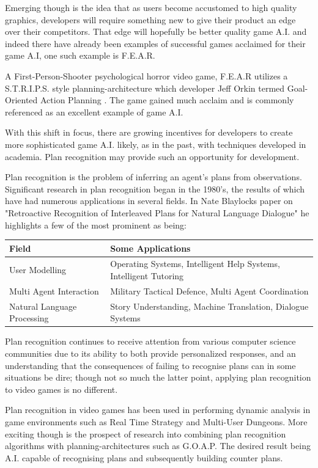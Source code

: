 \documentclass[parskip]{cs4rep}
\begin{document}
Emerging though is the idea that as users become accustomed to high quality graphics, developers will require something new to give their product an edge over their competitors. That edge will hopefully be better quality game A.I. and indeed there have already been examples of successful games acclaimed for their game A.I, one such example is F.E.A.R. 

A First-Person-Shooter psychological horror video game, F.E.A.R utilizes a S.T.R.I.P.S. style planning-architecture which developer Jeff Orkin termed Goal-Oriented Action Planning \cite{citeulike:5386647}. The game gained much acclaim and is commonly referenced as an excellent example of game A.I.

With this shift in focus, there are growing incentives for developers to create more sophisticated game A.I. likely, as in the past, with techniques developed in academia. Plan recognition may provide such an opportunity for development. 

Plan recognition is the problem of inferring an agent's plans from observations. Significant research in plan recognition began in the 1980's, the results of which have had numerous applications in several fields. In Nate Blaylocks paper on "Retroactive Recognition of Interleaved Plans for Natural Language Dialogue" \cite{oai:CiteSeerPSU:538953} he highlights a few of the most prominent as being:

\begin{tabular}{|l|p{8cm}|}
\hline 
\textbf{Field} & \textbf{Some Applications} \\ 
\hline 
User Modelling & Operating Systems, Intelligent Help Systems, Intelligent Tutoring \\ 
\hline 
Multi Agent Interaction & Military Tactical Defence, Multi Agent Coordination \\ 
\hline 
Natural Language Processing & Story Understanding, Machine Translation, Dialogue Systems \\ 
\hline
\end{tabular} 
\newline

Plan recognition continues to receive attention from various computer science communities due to its ability to both provide personalized responses, and an understanding that the consequences of failing to recognise plans can in some situations be dire; though not so much the latter point, applying plan recognition to video games is no different.

Plan recognition in video games has been used in performing dynamic analysis in game environments such as Real Time Strategy \cite{conf/aiide/SynnaeveB11} and Multi-User Dungeons\cite{Albrecht:1998:BMK:598277.598308}. More exciting though is the prospect of research into combining plan recognition algorithms with planning-architectures such as G.O.A.P. The desired result being A.I. capable of recognising plans and subsequently building counter plans.
\end{document}
